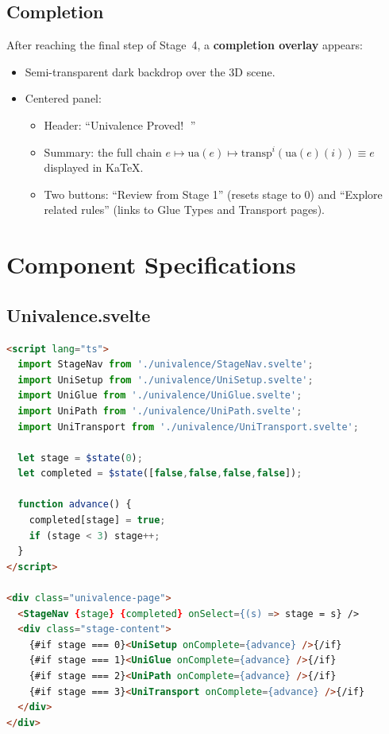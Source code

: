\documentclass[11pt,a4paper]{article}
\begin{document}
\subsection{Completion}

After reaching the final step of Stage~4, a \textbf{completion overlay}
appears:

\begin{itemize}
  \item Semi-transparent dark backdrop over the 3D scene.
  \item Centered panel:
    \begin{itemize}
      \item Header: ``Univalence Proved! 🎉''
      \item Summary: the full chain
        $e \mapsto \mathrm{ua}(e) \mapsto \mathrm{transp}^i(\mathrm{ua}(e)(i))
        \equiv e$ displayed in KaTeX.
      \item Two buttons: ``Review from Stage 1'' (resets stage to 0) and
        ``Explore related rules'' (links to Glue Types and Transport pages).
    \end{itemize}
\end{itemize}

\section{Component Specifications}

\subsection{Univalence.svelte}

\begin{lstlisting}[language=html]
<script lang="ts">
  import StageNav from './univalence/StageNav.svelte';
  import UniSetup from './univalence/UniSetup.svelte';
  import UniGlue from './univalence/UniGlue.svelte';
  import UniPath from './univalence/UniPath.svelte';
  import UniTransport from './univalence/UniTransport.svelte';

  let stage = $state(0);
  let completed = $state([false,false,false,false]);

  function advance() {
    completed[stage] = true;
    if (stage < 3) stage++;
  }
</script>

<div class="univalence-page">
  <StageNav {stage} {completed} onSelect={(s) => stage = s} />
  <div class="stage-content">
    {#if stage === 0}<UniSetup onComplete={advance} />{/if}
    {#if stage === 1}<UniGlue onComplete={advance} />{/if}
    {#if stage === 2}<UniPath onComplete={advance} />{/if}
    {#if stage === 3}<UniTransport onComplete={advance} />{/if}
  </div>
</div>
\end{lstlisting}
\end{document}
